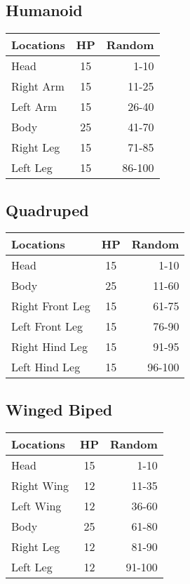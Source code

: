\begin{multicols}{2}
\subsection{Humanoid}
\begin{minipage}{\columnwidth}
	\begin{tabularx}{\columnwidth}{|X|c|r|}
		\hline
		Locations & HP & Random \\ \hline
		Head      & 15 &   1-10 \\ \hline
		Right Arm & 15 &  11-25 \\ \hline
		Left Arm  & 15 &  26-40 \\ \hline
		Body      & 25 &  41-70 \\ \hline
		Right Leg & 15 &  71-85 \\ \hline
		Left Leg  & 15 & 86-100 \\ \hline
	\end{tabularx}
\end{minipage}

\subsection{Quadruped}
\begin{minipage}{\columnwidth}
	\begin{tabularx}{\columnwidth}{|X|c|r|}
		\hline
		Locations       & HP & Random \\ \hline
		Head            & 15 &   1-10 \\ \hline
		Body            & 25 &  11-60 \\ \hline
		Right Front Leg & 15 &  61-75 \\ \hline
		Left Front Leg  & 15 &  76-90 \\ \hline
		Right Hind Leg  & 15 &  91-95 \\ \hline
		Left Hind Leg   & 15 & 96-100 \\ \hline
	\end{tabularx}
\end{minipage}

\subsection{Winged Biped}
\begin{minipage}{\columnwidth}
	\begin{tabularx}{\columnwidth}{|X|c|r|}
		\hline
		Locations  & HP & Random \\ \hline
		Head       & 15 &   1-10 \\ \hline
		Right Wing & 12 &  11-35 \\ \hline
		Left Wing  & 12 &  36-60 \\ \hline
		Body       & 25 &  61-80 \\ \hline
		Right Leg  & 12 &  81-90 \\ \hline
		Left Leg   & 12 & 91-100 \\ \hline
	\end{tabularx}
\end{minipage}


\end{multicols}
